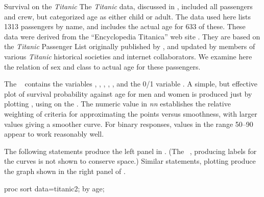 \begin{Example}[titanic4]{Survival on the \emph{Titanic}}
The \emph{Titanic} data, discussed in ,
included all passengers and crew, but categorized age as either
child or adult.
The data used here lists 1313 passengers by name, and includes the
actual age for 633 of these.
These data were derived from the ``Encyclopedia Titanica''
web site \citep{Hand:97}. They are based on the \emph{Titanic} Passenger List
originally published by \citet{Findlay:86}, and updated
by members of various \emph{Titanic} historical societies and internet
collaborators.
We examine here the relation of sex and class to actual age for these
passengers.

The \Dset\  contains the variables
, ,
, , , and the 0/1 variable
.
A simple, but effective plot of survival probability against age
for men and women is produced just by plotting
, using 
on the .
The numeric value in \emph{nn} establishes the relative
weighting of criteria for approximating the points versus
smoothness, with larger values giving a smoother curve.
For binary responses, values in the range 50--90 appear to work
reasonably well.

The following statements produce the left panel in .
(The \Dstp\ , producing labels for the curves
is not shown to conserve space.)
Similar statements, plotting 
produce the graph shown in the right panel of .
\begin{listing}
proc sort data=titanic2;
   by age;


\end{listing}
\end{Example}
